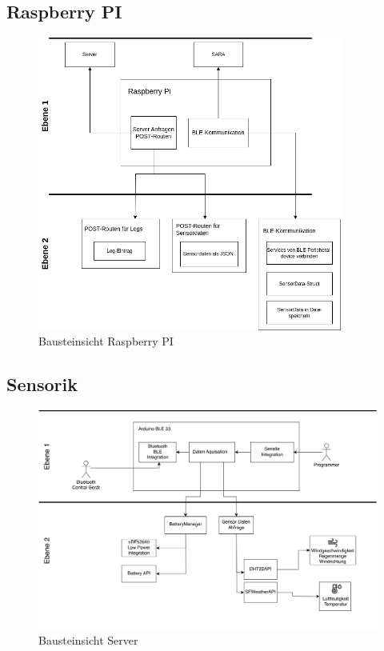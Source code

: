 \documentclass[
]{article}
\begin{document}
\subsection{Raspberry PI}
\begin{figure}[htbp]
	\centering
	\includegraphics[width=100mm]{resources/ADABausteinsicht.png}
	\caption{Bausteinsicht Raspberry PI}
	\label{fig:BausteinRaspberry}
\end{figure}  
\newpage
\subsection{Sensorik}
\begin{figure}[htbp]
	\centering
	\includegraphics[width=130mm]{resources/Bausteinschicht_Sara.png}
	\caption{Bausteinsicht Server}
	\label{fig:BausteinSensorik}
\end{figure}  
\end{document}
